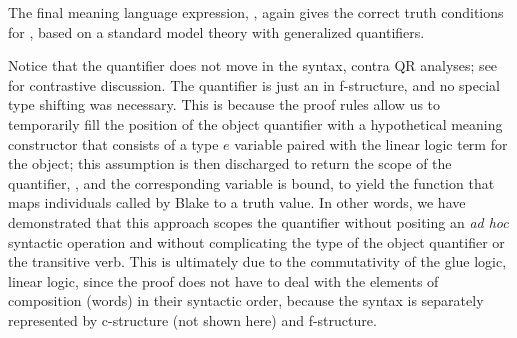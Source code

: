 \noindent
The final meaning language expression,
, again gives the correct truth
  conditions for , based on a standard
  model theory with generalized quantifiers. 
  
  Notice that the
  quantifier does not move in the syntax, contra QR analyses; see \citet{Gotham2018} for contrastive discussion. The quantifier is just an
   in f-structure, and no special type shifting was
  necessary. This is because the proof rules  allow 
  us to temporarily fill the position of the object quantifier with a
  hypothetical meaning constructor that consists of a type $e$ variable
  paired with the linear logic term for the object; this assumption is
  then discharged to return the scope
  of the quantifier, , and the corresponding
  variable is bound, to yield the function that maps individuals called
  by Blake to a truth value. In other words, we have demonstrated that
  this approach scopes the quantifier without positing an \emph{ad
    hoc} syntactic operation and without complicating the type of the
  object quantifier or the transitive verb. This is ultimately due to
  the commutativity of the glue logic, linear logic, since the proof
  does not have to deal with the elements of composition (words) in
  their syntactic order, because the syntax is separately represented by
  c-structure (not shown here) and f-structure. 

